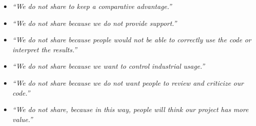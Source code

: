 %
\begin{itemize}
\item \textit{``We do not share to keep a comparative advantage.''}


\item \textit{``We do not share because we do not provide support.''}


\item \textit{``We do not share because people would not be able to
correctly use the code or interpret the results.''}



\item \textit{``We do not share because we want to control industrial usage.''}


\item \textit{``We do not share because we do not want people to review
and criticize our code.''}


\item \textit{``We do not share, because in this way, people will think our
project has more value.''}

\end{itemize}

